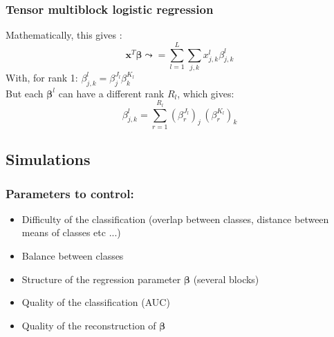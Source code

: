 \documentclass{beamer}
\begin{document}
\begin{frame}
    \frametitle{Tensor multiblock logistic regression}
    Mathematically, this gives :
    $$\mathbf{x}^T\bm{\beta} \leadsto =  \sum\limits_{l = 1}^L \sum\limits_{j,k} x_{j,k}^l\beta_{j,k}^l$$
    With, for rank 1: $\beta_{j,k}^l = \beta_j^{J_l}\beta_k^{K_l}$\\[10 pt]
    But each $\bm{\beta}^l$ can have a different rank $R_l$, which gives:
    $$\beta_{j,k}^l = \sum\limits_{r = 1}^{R_l} (\beta_r^{J_l})_j \, (\beta_r^{K_l})_k $$
\end{frame}

\begin{frame}
    \section{Simulations}    
\end{frame}

\begin{frame}
    \frametitle{Parameters to control:}
    \begin{itemize}
        \item Difficulty of the classification (overlap between classes, distance between means of classes etc ...)\\[12 pt]
        \item Balance between classes\\[12 pt]
        \item Structure of the regression parameter $\bm{\beta}$ (several blocks)\\[12 pt] 
        \item Quality of the classification (AUC)\\[12 pt]
        \item Quality of the reconstruction of $\bm{\beta}$ \nocite{picto}
    \end{itemize}
\end{frame}
\end{document}

